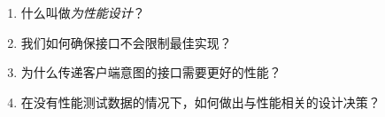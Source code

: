 \begin{enumerate}
\item 
什么叫做\textit{为性能设计}？

\item 
我们如何确保接口不会限制最佳实现？

\item 
为什么传递客户端意图的接口需要更好的性能？

\item
在没有性能测试数据的情况下，如何做出与性能相关的设计决策？

\end{enumerate}